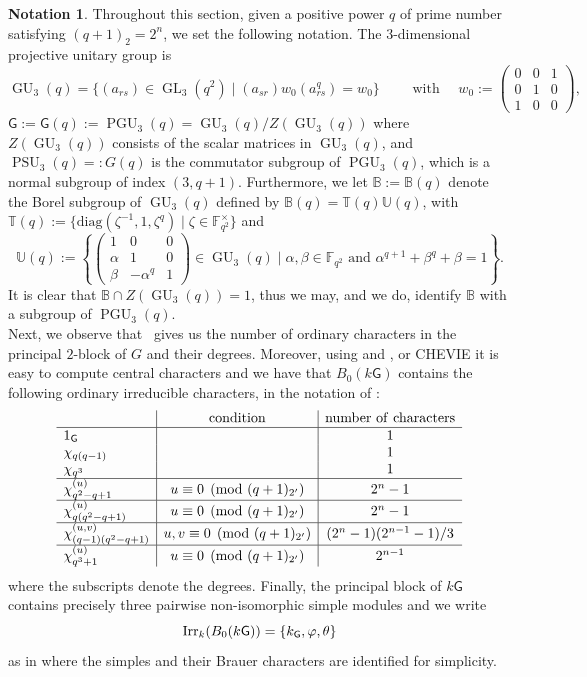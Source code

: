 \documentclass[12pt,a4paper]{amsart}
\theoremstyle{plain}\newtheorem{Theorem}{Theorem}[section]
\theoremstyle{plain}\newtheorem{Conjecture}[Theorem]{Conjecture}
\theoremstyle{plain}\newtheorem{Corollary}[Theorem]{Corollary}
\theoremstyle{plain}\newtheorem{Lemma}[Theorem]{Lemma}
\theoremstyle{plain}\newtheorem{Proposition}[Theorem]{Proposition}
\theoremstyle{definition}\newtheorem{Definition}[Theorem]{Definition}
\theoremstyle{definition}\newtheorem{Example}[Theorem]{Example}
\theoremstyle{definition}\newtheorem{Examples}[Theorem]{Examples}
\theoremstyle{definition}\newtheorem{Remark}[Theorem]{Remark}
\theoremstyle{definition}\newtheorem{Question}[Theorem]{Question}
\theoremstyle{definition}\newtheorem{Notation}[Theorem]{Notation}
\theoremstyle{definition}\newtheorem{Hypothesis}[Theorem]{Hypothesis}
\theoremstyle{definition}\newtheorem{Assumption}[Theorem]{Assumption}
\theoremstyle{definition}\newtheorem{Strategy}[Theorem]{Strategy}
\theoremstyle{definition}\newtheorem{Contents}[Theorem]{Contents}
\theoremstyle{definition}\newtheorem{Computations}[Theorem]{Computations}
\theoremstyle{definition}\newtheorem{Equivalences}[Theorem]{Equivalences}
\theoremstyle{definition}\newtheorem{Notation/Definition}[Theorem]{Notation/Definition}
\theoremstyle{definition}\newtheorem{noth}[Theorem]{}
\theoremstyle{plain}\newtheorem{Step}[Theorem]{Step}
\newcommand{\GL}{\operatorname{GL}}
\newcommand{\PSU}{\operatorname{PSU}}
\newcommand{\PGU}{\operatorname{PGU}}
\newcommand{\GU}{\operatorname{GU}}
\begin{document}
\begin{Notation}\label{nota:PGU}%
Throughout this section, given a positive power $q$ of prime number satisfying $(q+1)_{2}=2^{n}$, 
we set the following notation.
The $3$-dimensional projective unitary group is 
$$\GU_{3}(q)=\{(a_{rs})\in \GL_{3}(q^{2})\mid (a_{sr})w_{0}(a_{rs}^{q})=w_{0}\}\qquad\text{ with }\quad w_{0}:=\left(\begin{smallmatrix} 0& 0&1 \\ 0& 1&0 \\ 1&0 &0
\end{smallmatrix}\right),$$
$\mathsf{G}:=\mathsf{G}(q):=\PGU_{3}(q)=\GU_{3}(q)/Z(\GU_{3}(q))$ where $Z(\GU_{3}(q))$ consists of the scalar matrices in $\GU_{3}(q)$, 
and $\PSU_{3}(q)=:G(q)$ is the commutator subgroup of $\PGU_{3}(q)$, which is a normal subgroup of index $(3,q+1)$.
Furthermore, we let $\mathbb{B}:=\mathbb{B}(q)$ denote the Borel subgroup of $\GU_{3}(q)$ defined by $\mathbb{B}(q)=\mathbb{T}(q)\mathbb{U}(q)$, with
$\mathbb{T}(q):=\{\text{diag}(\zeta^{-1},1,\zeta^{q})\mid \zeta\in\mathbb{F}_{q^{2}}^{\times}\}$ and 
$$
\mathbb{U}(q):=\left\{ 
 \left( \begin{smallmatrix} 1 & 0&0 \\   \alpha &1 &0 \\  \beta & -\alpha^{q}&1 
  \end{smallmatrix}\right)
   \in\GU_{3}(q)\mid 
   \alpha,\beta\in\mathbb{F}_{q^{2}}\text{ and }\alpha^{q+1}+\beta^{q}+\beta=1
  \right\}.$$
It is clear that $\mathbb{B} \cap Z(\GU_{3}(q))=1$, thus we may, and we do, identify $\mathbb{B}$ with a subgroup of $\PGU_{3}(q)$.\\
%
Next, we observe that~\cite[Theorem 1A]{Brauerwr} gives us the number of ordinary characters in the principal $2$-block of $G$ and their degrees. 
Moreover, using \cite{SF73} and \cite[Table~1.1 and Table~3.1]{Gec90}, or CHEVIE \cite{Chev} it is easy to compute central characters and we have that $B_{0}(k\mathsf{G})$ contains the following ordinary irreducible characters, 
in the notation of \cite{Gec90}: 
$$
\begin{array}{l|c|c} & \mathrm{condition}&\mathrm{number \ of \ characters}\\ 
\noalign{\hrule }
1_{\mathsf{G}}   &  &1 \\ 
\chi_{q(q-1)}&  &1 \\
\chi_{q^3}&  &1 \\
\hline
\chi_{q^2-q+1}^{(u)}&  u\equiv 0\pmod{(q+1)_{2'}}&2^n-1  \\ 
\hline
\chi_{q(q^2-q+1)}^{(u)}& u\equiv 0\pmod{(q+1)_{2'}}&2^n-1  \\
\hline
\chi_{(q-1)(q^2-q+1)}^{\color{black}(u,v)} &u,v\equiv 0\pmod{(q+1)_{2'}} & (2^n-1)(2^{n-1}-1)/3 \\
\hline
\chi_{q^3+1}^{(u)}& u\equiv 0\pmod{(q+1)_{2'}}&2^{n-1}
\end{array}
$$
where the subscripts denote the degrees.
Finally, the principal block of $k\mathsf{G}$ contains precisely three pairwise non-isomorphic  simple modules and we write
$$\mathrm{Irr}_{k}(B_{0}(k\mathsf{G}))=\{k_{\mathsf{G}}, \varphi, \theta \}$$
as  in \cite[Theorem~4.1]{His04} where the simples and their Brauer characters are identified for simplicity.


\end{Notation}
\end{document}
